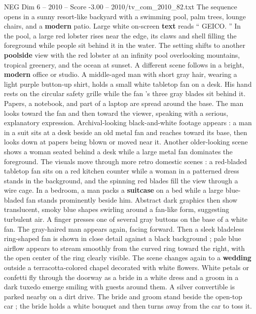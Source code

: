 \begin{textsample}{NEG Dim 6 – 2010 – Score -3.00 – 2010/tv\_com\_2010\_82.txt}  \label{ex:f6_neg_003}
The sequence opens in a sunny resort-like backyard with a swimming pool, palm trees, lounge chairs, and a \textbf{modern} patio.
Large white on-screen \textbf{text} reads “ GEICO. ” In the pool, a large red lobster rises near the edge, its claws and shell filling the foreground while people sit behind it in the water.
The setting shifts to another \textbf{poolside} view with the red lobster at an infinity pool overlooking mountains, tropical greenery, and the ocean at sunset.
A different scene follows in a bright, \textbf{modern} office or studio.
A middle-aged man with short gray hair, wearing a light purple button-up shirt, holds a small white tabletop fan on a desk.
His hand rests on the circular safety grille while the fan ’s three gray blades sit behind it.
Papers, a notebook, and part of a laptop are spread around the base.
The man looks toward the fan and then toward the viewer, speaking with a serious, explanatory expression.
Archival-looking black-and-white footage appears : a man in a suit sits at a desk beside an old metal fan and reaches toward its base, then looks down at papers being blown or moved near it.
Another older-looking scene shows a woman seated behind a desk while a large metal fan dominates the foreground.
The visuals move through more retro domestic scenes : a red-bladed tabletop fan sits on a red kitchen counter while a woman in a patterned dress stands in the background, and the spinning red blades fill the view through a wire cage.
In a bedroom, a man packs a \textbf{suitcase} on a bed while a large blue-bladed fan stands prominently beside him.
Abstract dark graphics then show translucent, smoky blue shapes swirling around a fan-like form, suggesting turbulent air.
A finger presses one of several gray buttons on the base of a white fan.
The gray-haired man appears again, facing forward.
Then a sleek bladeless ring-shaped fan is shown in close detail against a black background ; pale blue airflow appears to stream smoothly from the curved ring toward the right, with the open center of the ring clearly visible.
The scene changes again to a \textbf{wedding} outside a terracotta-colored chapel decorated with white flowers.
White petals or confetti fly through the doorway as a bride in a white dress and a groom in a dark tuxedo emerge smiling with guests around them.
A silver convertible is parked nearby on a dirt drive.
The bride and groom stand beside the open-top car ; the bride holds a white bouquet and then turns away from the car to toss it.

\end{textsample}
